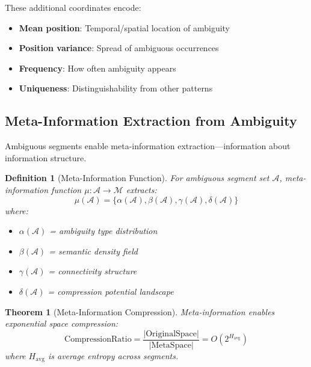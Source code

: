 \documentclass[12pt,a4paper]{article}
\newtheorem{theorem}{Theorem}
\newtheorem{definition}{Definition}
\begin{document}
These additional coordinates encode:
\begin{itemize}
\item \textbf{Mean position}: Temporal/spatial location of ambiguity
\item \textbf{Position variance}: Spread of ambiguous occurrences
\item \textbf{Frequency}: How often ambiguity appears
\item \textbf{Uniqueness}: Distinguishability from other patterns
\end{itemize}

\subsection{Meta-Information Extraction from Ambiguity}

Ambiguous segments enable meta-information extraction—information about information structure.

\begin{definition}[Meta-Information Function]
For ambiguous segment set $\mathcal{A}$, meta-information function $\mu: \mathcal{A} \to \mathcal{M}$ extracts:
\begin{equation}
\mu(\mathcal{A}) = \{\alpha(\mathcal{A}), \beta(\mathcal{A}), \gamma(\mathcal{A}), \delta(\mathcal{A})\}
\end{equation}
where:
\begin{itemize}
\item $\alpha(\mathcal{A})$ = ambiguity type distribution
\item $\beta(\mathcal{A})$ = semantic density field
\item $\gamma(\mathcal{A})$ = connectivity structure
\item $\delta(\mathcal{A})$ = compression potential landscape
\end{itemize}
\end{definition}

\begin{theorem}[Meta-Information Compression]
Meta-information enables exponential space compression:
\begin{equation}
\text{CompressionRatio} = \frac{|\text{OriginalSpace}|}{|\text{MetaSpace}|} = O(2^{H_{\text{avg}}})
\end{equation}
where $H_{\text{avg}}$ is average entropy across segments.
\end{theorem}
\end{document}
